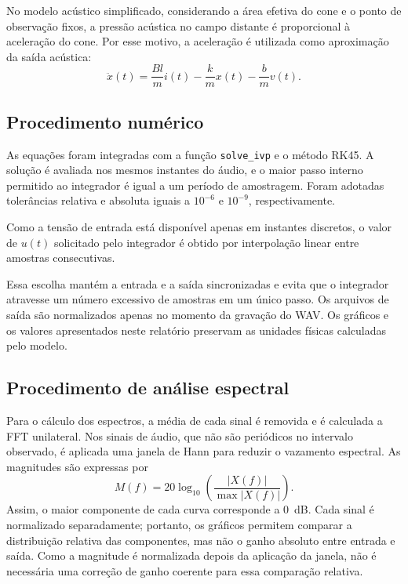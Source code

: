 \documentclass[12pt,letterpaper]{article}
\begin{document}
No modelo acústico simplificado, considerando a área efetiva do cone e o ponto
de observação fixos, a pressão acústica no campo distante é proporcional à
aceleração do cone. Por esse motivo, a aceleração é utilizada como aproximação
da saída acústica:
\begin{equation}
    \ddot{x}(t)=\frac{Bl}{m}i(t)-\frac{k}{m}x(t)-\frac{b}{m}v(t).
    \label{eq:aceleracao}
\end{equation}

\subsection{Procedimento numérico}

As equações foram integradas com a função \texttt{solve\_ivp} e o método
RK45. A solução é avaliada nos mesmos instantes do áudio, e o maior passo
interno permitido ao integrador é igual a um período de amostragem. Foram
adotadas tolerâncias relativa e absoluta iguais a $10^{-6}$ e $10^{-9}$,
respectivamente.

Como a tensão de entrada está disponível apenas em instantes discretos, o valor
de $u(t)$ solicitado pelo integrador é obtido por interpolação linear entre
amostras consecutivas.

Essa escolha mantém a entrada e a saída sincronizadas e evita que o integrador
atravesse um número excessivo de amostras em um único passo. Os arquivos de
saída são normalizados apenas no momento da gravação do WAV. Os gráficos e os
valores apresentados neste relatório preservam as unidades físicas calculadas
pelo modelo.

\subsection{Procedimento de análise espectral}

Para o cálculo dos espectros, a média de cada sinal é removida e é calculada a
FFT unilateral. Nos sinais de áudio, que não são periódicos no intervalo
observado, é aplicada uma janela de Hann para reduzir o vazamento espectral. As
magnitudes são expressas por
\begin{equation}
    M(f)=20\log_{10}\left(\frac{|X(f)|}{\max |X(f)|}\right).
    \label{eq:espectro}
\end{equation}
Assim, o maior componente de cada curva corresponde a \SI{0}{dB}. Cada sinal é
normalizado separadamente; portanto, os gráficos permitem comparar a
distribuição relativa das componentes, mas não o ganho absoluto entre entrada e
saída. Como a magnitude é normalizada depois da aplicação da janela, não é
necessária uma correção de ganho coerente para essa comparação relativa.
\end{document}
